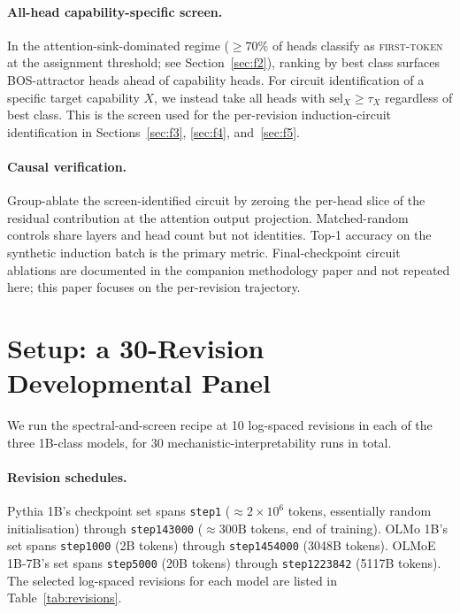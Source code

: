 \documentclass[11pt]{article}
\begin{document}
\paragraph{All-head capability-specific screen.} In the
attention-sink-dominated regime ($\ge\!70\%$ of heads classify as
\textsc{first-token} at the assignment threshold; see Section~\ref{sec:f2}),
ranking by best class surfaces BOS-attractor heads ahead of capability
heads. For circuit identification of a specific target capability $X$, we
instead take all heads with $\mathrm{sel}_X \ge \tau_X$ regardless of best
class. This is the screen used for the per-revision induction-circuit
identification in Sections~\ref{sec:f3}, \ref{sec:f4}, and~\ref{sec:f5}.

\paragraph{Causal verification.} Group-ablate the screen-identified circuit
by zeroing the per-head slice of the residual contribution at the attention
output projection. Matched-random controls share layers and head count but
not identities. Top-1 accuracy on the synthetic induction batch is the
primary metric. Final-checkpoint circuit ablations are documented in the
companion methodology paper and not repeated here; this paper focuses on
the per-revision trajectory.

\section{Setup: a 30-Revision Developmental Panel}
\label{sec:setup}

We run the spectral-and-screen recipe at 10 log-spaced revisions in each
of the three 1B-class models, for 30 mechanistic-interpretability runs in
total.

\paragraph{Revision schedules.} Pythia 1B's checkpoint set spans
\texttt{step1} ($\approx 2{\times}10^6$ tokens, essentially random
initialisation) through \texttt{step143000} ($\approx 300\mathrm{B}$
tokens, end of training). OLMo 1B's set spans
\texttt{step1000} (2B tokens) through
\texttt{step1454000} (3048B tokens). OLMoE 1B-7B's set spans
\texttt{step5000} (20B tokens) through \texttt{step1223842}
(5117B tokens). The
selected log-spaced revisions for each model are listed in
Table~\ref{tab:revisions}.
\end{document}
